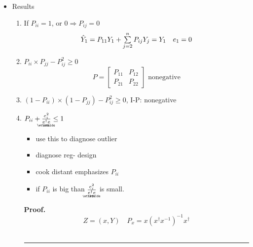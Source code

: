 \documentclass{article}
\newenvironment{proof}[1][Proof]{\noindent\textbf{#1.} }{\ \rule{0.5em}{0.5em}}
\begin{document}
\begin{itemize}
\item Results

\begin{enumerate}
\item If $P_{ii}=1$, or $0\Rightarrow P_{ij}=0$%
\begin{equation*}
\hat{Y}_{1}=P_{11}Y_{1}+\mathop{\textstyle \sum }\limits_{j=2}^{n}P_{ij}Y_{j}=Y_{1}\quad e_{1}=0
\end{equation*}

\item $P_{ii}\times P_{jj}-P_{ij}^{2}\geq 0$%
\begin{equation*}
P=\left[ 
\begin{array}{cc}
P_{11} & P_{12} \\ 
P_{21} & P_{22}%
\end{array}%
\right] \text{ nonegative}
\end{equation*}

\item $\left( 1-P_{ii}\right) \times \left( 1-P_{jj}\right) -P_{ij}^{2}\geq
0 $, I-P: nonegative

\item $P_{ii}+\frac{e_{i}^{2}}{%
\underaccent{\wtilde}{e}%
^{\dagger }%
\underaccent{\wtilde}{e}%
}\leq 1$

\begin{itemize}
\item use this to diagnose outlier

\item diagnose reg- design

\item cook distant emphasizes $P_{ii}$

\item if $P_{ii}$ is big than $\frac{e_{i}^{2}}{%
\underaccent{\wtilde}{e}%
^{\dagger }%
\underaccent{\wtilde}{e}%
}$ is small.
\end{itemize}

\begin{proof}
\begin{equation*}
Z=\left( x,Y\right) \quad P_{x}=x\left( x^{\dagger }x^{-1}\right)
^{-1}x^{\dagger }
\end{equation*}
\end{proof}
\end{enumerate}
\end{itemize}
\end{document}
